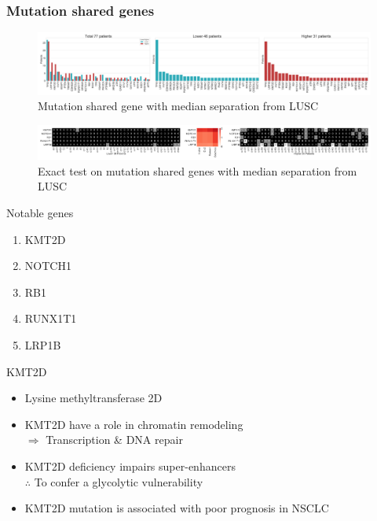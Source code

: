 \documentclass{beamer}
\begin{document}
            \begin{frame}[allowframebreaks]
                \frametitle{Mutation shared genes}

                \begin{figure}
                    \includegraphics[width=0.9 \linewidth]{figures/Mutation_Shared_Proportion/Genes/BWA.SQC.Mean.pdf}
                    \caption{Mutation shared gene with median separation from LUSC}
                \end{figure}
                \framebreak

                \begin{figure}
                    \includegraphics[width=0.9 \linewidth]{figures/Mutation_Shared_Proportion/Exact/BWA-SQC.Median.pdf}
                    \caption{Exact test on mutation shared genes with median separation from LUSC}
                \end{figure}

                \begin{block}{Notable genes}
                    \begin{enumerate}
                        \item KMT2D
                        \item NOTCH1
                        \item RB1
                        \item RUNX1T1
                        \item LRP1B
                    \end{enumerate}
                \end{block}

                \begin{block}{KMT2D}
                    \begin{itemize}
                        \item Lysine methyltransferase 2D
                        \item KMT2D have a role in chromatin remodeling \\
                            $\Rightarrow$ Transcription \& DNA repair \cite{KMT2D-01, KMT2D-02}
                        \item KMT2D deficiency impairs super-enhancers \\
                            $\therefore$ To confer a glycolytic vulnerability \cite{KMT2D-03}
                        \item KMT2D mutation is associated with poor prognosis in NSCLC \cite{KMT2D-04}
                    \end{itemize}
                \end{block}


\end{frame}
\end{document}
